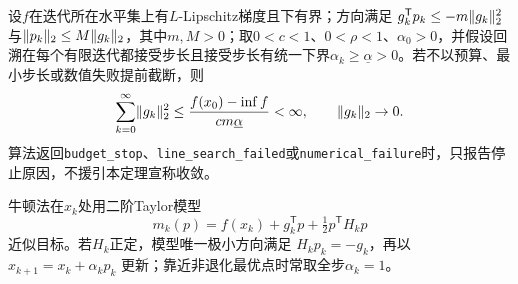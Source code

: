 
\begin{theorem}[Armijo梯度法的一阶收敛条件]
设$f$在迭代所在水平集上有$L$-Lipschitz梯度且下有界；方向满足
$g_k^{\mathsf T}p_k\le-m\lVert g_k\rVert_2^2$与$\lVert p_k\rVert_2\le M\lVert g_k\rVert_2$，其中$m,M>0$；取$0<c<1$、$0<\rho<1$、$\alpha_0>0$，并假设回溯在每个有限迭代都接受步长且接受步长有统一下界$\alpha_k\ge\underline\alpha>0$。若不以预算、最小步长或数值失败提前截断，则
\[
\sum_{k=0}^{\infty}\lVert g_k\rVert_2^2
\le\frac{f(x_0)-\inf f}{c m\underline\alpha}<\infty,
\qquad \lVert g_k\rVert_2\to0.
\]
算法返回\texttt{budget\_stop}、\texttt{line\_search\_failed}或\texttt{numerical\_failure}时，只报告停止原因，不援引本定理宣称收敛。
\end{theorem}


牛顿法在$x_k$处用二阶Taylor模型
\[
m_k(p)=f(x_k)+g_k^{\mathsf T}p+\tfrac12p^{\mathsf T}H_kp
\]
近似目标。若$H_k$正定，模型唯一极小方向满足 $H_kp_k=-g_k$，再以 $x_{k+1}=x_k+\alpha_kp_k$ 更新；靠近非退化最优点时常取全步$\alpha_k=1$。

